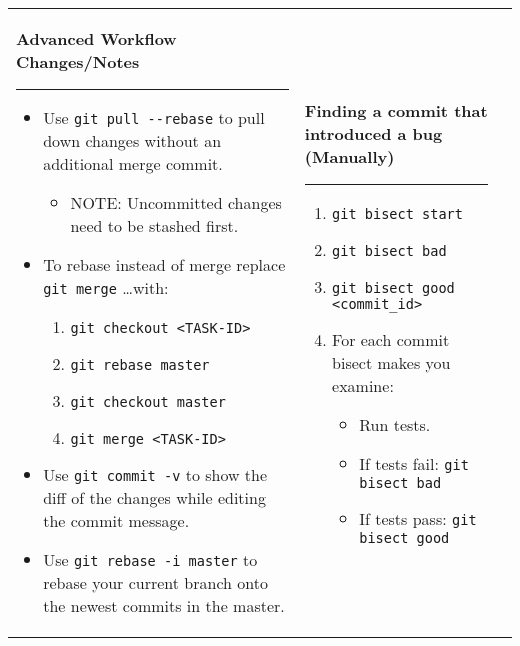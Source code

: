 \documentclass[landscape]{article}
\begin{document}
\begin{tabular*}{10.5in}{|p{2.9in}|p{2.9in}|p{2.9in}|}
\begin{flushleft}
        \textbf{\large{Advanced Workflow Changes/Notes}}
        \rule{2.9in}{.5pt}
        \small
        \begin{itemize}
            \item{Use \verb!git pull --rebase! to pull down changes without an
                additional merge commit.}
                \begin{itemize}
                    \item{NOTE: Uncommitted changes need to be stashed first.}
                \end{itemize}
            \item{To rebase instead of merge replace \verb!git merge! \ldots with:}
                \begin{enumerate}
                    \item{\verb!git checkout <TASK-ID>!}
                    \item{\verb!git rebase master!}
                    \item{\verb!git checkout master!}
                    \item{\verb!git merge <TASK-ID>!}
                \end{enumerate}
            \item{Use \verb!git commit -v! to show the diff of the changes
                while editing the commit message.}
            \item{Use \verb!git rebase -i master! to rebase your current branch
                onto the newest commits in the master.}
        \end{itemize}
    \end{flushleft}
    &
    \begin{flushleft}
        \textbf{\large{Finding a commit that introduced a bug (Manually)}}
        \rule{2.9in}{.5pt}
        \small
        \begin{enumerate}
            \item{\verb!git bisect start!}
            \item{\verb!git bisect bad!}
            \item{\verb!git bisect good <commit_id>!}
            \item{For each commit bisect makes you examine:}
                \begin{itemize}
                    \item{Run tests.}
                    \item{If tests fail: \verb!git bisect bad!}
                    \item{If tests pass: \verb!git bisect good!}

\end{itemize}
\end{enumerate}
\end{flushleft}
\end{tabular*}
\end{document}
